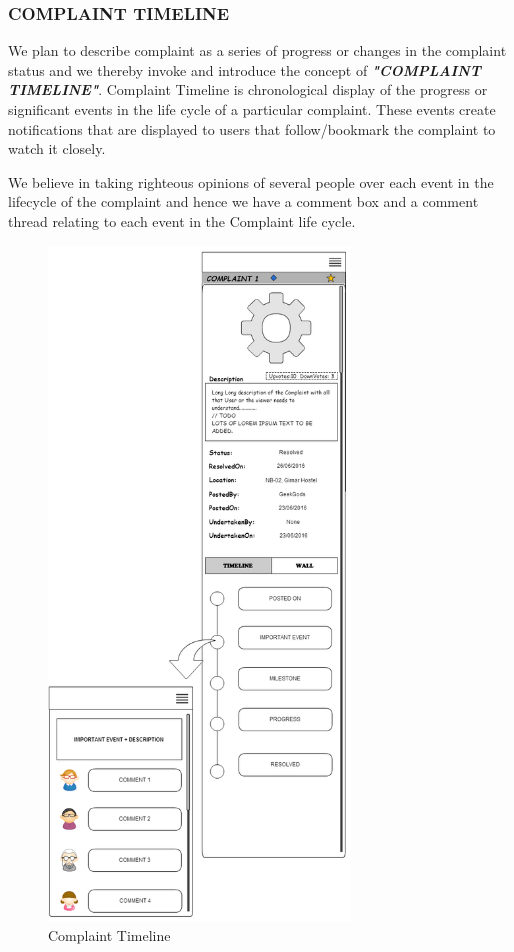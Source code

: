 \documentclass[12pt]{article}
\begin{document}
     \subsubsection{COMPLAINT TIMELINE}
     \par We plan to describe complaint as a series of progress or changes in the complaint status and we thereby invoke and introduce the concept of \textbf{\textit{"COMPLAINT TIMELINE"}}. Complaint Timeline is chronological display of the progress or significant events in the life cycle of a particular complaint. These events create notifications that are displayed to users that follow/bookmark the complaint to watch it closely.  
     \par We believe in taking righteous opinions of several people over each event in the lifecycle of the complaint and hence we have a comment box and a comment thread relating to each event in the Complaint life cycle.  
 \begin{figure}
  \caption{Complaint Timeline}\label{fig:complainTimelineScreen}
  \includegraphics[width=8cm]{./appMockUp/complainTimelineScreen}
  \end{figure}
    
\end{document}
